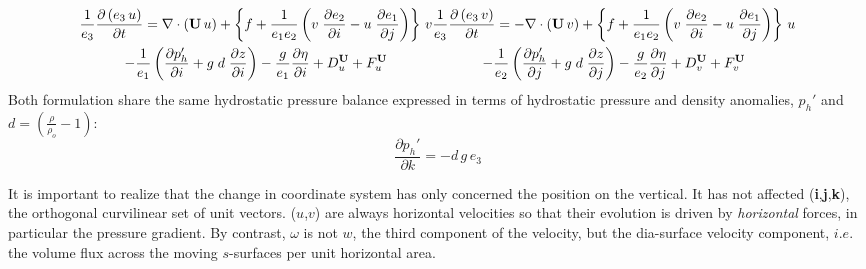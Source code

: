 \documentclass[../main/NEMO_manual]{subfiles}
\begin{document}
\begin{subequations}
  \label{apdx:A_dyn_flux}
  \begin{multline}
    \label{apdx:A_PE_dyn_flux_u}
    \frac{1}{e_3} \frac{\partial \left(  e_3\,u  \right) }{\partial t} =
    \nabla \cdot \left(   {{\rm {\bf U}}\,u}   \right)
    +   \left\{ {f + \frac{1}{e_1 e_2 }\left(    v  \;\frac{\partial e_2 }{\partial i}
          -u  \;\frac{\partial e_1 }{\partial j}            \right)} \right\} \,v     \\
    -   \frac{1}{e_1 } \left(    \frac{\partial p_h'}{\partial i} + g\; d  \; \frac{\partial z}{\partial i}    \right)
    -   \frac{g}{e_1 } \frac{\partial \eta}{\partial i}
    +   D_u^{\vect{U}}  +   F_u^{\vect{U}}
  \end{multline}
  \begin{multline}
    \label{apdx:A_dyn_flux_v}
    \frac{1}{e_3}\frac{\partial \left(  e_3\,v  \right) }{\partial t}=
    -  \nabla \cdot \left(   {{\rm {\bf U}}\,v}   \right)
    +   \left\{ {f + \frac{1}{e_1 e_2 }\left(    v  \;\frac{\partial e_2 }{\partial i}
          -u  \;\frac{\partial e_1 }{\partial j}            \right)} \right\} \,u     \\
    -   \frac{1}{e_2 } \left(    \frac{\partial p_h'}{\partial j} + g\; d  \; \frac{\partial z}{\partial j}    \right)
    -   \frac{g}{e_2 } \frac{\partial \eta}{\partial j}
    +  D_v^{\vect{U}}  +   F_v^{\vect{U}}
  \end{multline}
\end{subequations}
Both formulation share the same hydrostatic pressure balance expressed in terms of
hydrostatic pressure and density anomalies, $p_h'$ and $d=( \frac{\rho}{\rho_o}-1 )$:
\begin{equation}
  \label{apdx:A_dyn_zph}
  \frac{\partial p_h'}{\partial k} = - d \, g \, e_3
\end{equation}

It is important to realize that the change in coordinate system has only concerned the position on the vertical.
It has not affected (\textbf{i},\textbf{j},\textbf{k}), the orthogonal curvilinear set of unit vectors.
($u$,$v$) are always horizontal velocities so that their evolution is driven by \emph{horizontal} forces,
in particular the pressure gradient.
By contrast, $\omega$ is not $w$, the third component of the velocity, but the dia-surface velocity component,
$i.e.$ the volume flux across the moving $s$-surfaces per unit horizontal area. 


\end{document}
